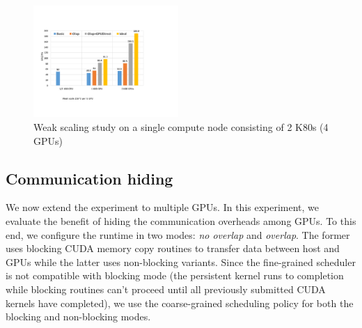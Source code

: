 \begin{figure}[htb]
\centering
\includegraphics[width=0.49\textwidth]{figures/stencil_tida.pdf}
\caption{Weak scaling study on a single compute node consisting of 2 K80s (4 GPUs)}
\label{stencil_onnode}
\end{figure}


\subsection{Communication hiding}
We now extend the experiment to multiple GPUs.
In this experiment, we evaluate the benefit of hiding the communication overheads among GPUs.
To this end, we configure the runtime in two modes: {\em no overlap} and {\em overlap}.
The former uses blocking CUDA memory copy routines to transfer data between host and GPUs while the latter uses non-blocking variants.
Since the fine-grained scheduler is not compatible with blocking mode (the persistent kernel runs to completion while blocking routines can't proceed until all previously submitted CUDA kernels have completed), we use the coarse-grained scheduling policy for both the blocking and non-blocking modes.

